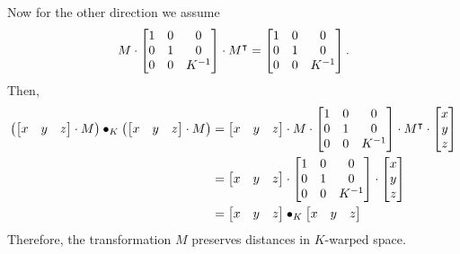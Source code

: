 \documentclass[newpage,hints,handout,noauthor,nooutcomes,12pt]{ximera}
\begin{document}
\begin{problem}
\begin{freeResponse}
Now for the other direction we assume 
\[
M\cdot\begin{bmatrix}
1 & 0 & 0\\
0 & 1 & 0\\
0 & 0 & K^{-1}
\end{bmatrix}
  \cdot M^\intercal=\begin{bmatrix}
1 & 0 & 0\\
0 & 1 & 0\\
0 & 0 & K^{-1}
\end{bmatrix}. 
  \]
Then,
\begin{align*}
\left(\begin{bmatrix}
x & y & z
\end{bmatrix} \cdot M \right) \bullet_{K} \left( \begin{bmatrix}
x & y & z
\end{bmatrix} \cdot M \right) 
&= \begin{bmatrix}
x & y & z
\end{bmatrix} \cdot M \cdot 
\begin{bmatrix}
1 & 0 & 0\\
0 & 1 & 0\\
0 & 0 & K^{-1}
\end{bmatrix} \cdot M^\intercal \cdot
\begin{bmatrix}
x \\
y \\ 
z
\end{bmatrix} \\
&= \begin{bmatrix}
x & y & z
\end{bmatrix} \cdot 
\begin{bmatrix}
1 & 0 & 0\\
0 & 1 & 0\\
0 & 0 & K^{-1}
\end{bmatrix} \cdot 
\begin{bmatrix}
x \\ 
y \\ 
z
\end{bmatrix} \\
&= \begin{bmatrix}
x & y & z
\end{bmatrix} \bullet_{K} \begin{bmatrix}
x & y & z
\end{bmatrix}
\end{align*}
Therefore, the transformation $M$ preserves distances in $K$-warped space. 
\end{freeResponse}

\end{problem}
\end{document}
